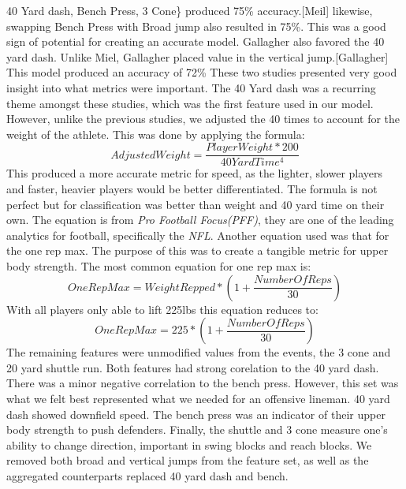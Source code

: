 \documentclass[confrence]{IEEEtran}
\begin{document}
40 Yard dash, Bench Press, 3 Cone\} produced 75\% accuracy.[Meil] likewise, swapping Bench Press with Broad jump also resulted in 75\%.
This was a good sign of potential for creating an accurate model.
Gallagher also favored the 40 yard dash. Unlike Miel, Gallagher placed value in the vertical jump.[Gallagher] This model produced an accuracy of 72\%
These two studies presented very good insight into what metrics were important.
The 40 Yard dash was a recurring theme amongst these studies, which was the first feature used in our model.
However, unlike the previous studies, we adjusted the 40 times to account for the weight of the athlete. This was done by applying the formula:
\[
    AdjustedWeight = \frac{PlayerWeight*200}{40YardTime^4}
\]
This produced a more accurate metric for speed, as the lighter, slower players and faster, heavier players would be better differentiated.
The formula is not perfect but for classification was better than weight and 40 yard time on their own.
The equation is from \textit{Pro Football Focus(PFF)}, they are one of the leading analytics for football, specifically the \textit{NFL}.
Another equation used was that for the one rep max. The purpose of this was to create a tangible metric for upper body strength.
The most common equation for one rep max is:
\[
    OneRepMax = WeightRepped*(1+\frac{NumberOfReps}{30})
\]
With all players only able to lift 225lbs this equation reduces to:
\[
    OneRepMax = 225*(1+\frac{NumberOfReps}{30})
\]
The remaining features were unmodified values from the events, the 3 cone and 20 yard shuttle run.
Both features had strong corelation to the 40 yard dash. There was a minor negative correlation to the bench press.
However, this set was what we felt best represented what we needed for an offensive lineman.
40 yard dash showed downfield speed. The bench press was an indicator of their upper body strength to push defenders. Finally, the shuttle and 3 cone measure one's ability to change direction, important in swing blocks and reach blocks.
We removed both broad and vertical jumps from the feature set, as well as the aggregated counterparts replaced 40 yard dash and bench.
\end{document}
